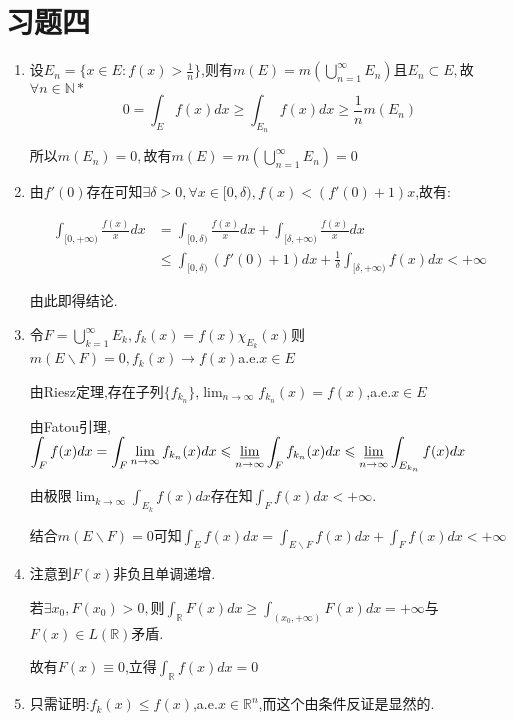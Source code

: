 \documentclass[UTF8, a4paper, 12pt, oneside, onecolumn]{article}
\numberwithin{equation}{section}
\numberwithin{figure}{section}
\numberwithin{table}{section}
\theoremstyle{nonumberplain}	%
\theoremstyle{plain}	%
\theoremstyle{plain}	%
\theoremstyle{plain}	%
\theoremstyle{plain}	%
\theoremstyle{nonumberplain}
\begin{document}
\part{习题四}
\begin{enumerate}
	\item 设$\displaystyle E_n=\{x\in E:f(x)>\frac{1}{n}\} $,则有$\displaystyle m(E)=m(\bigcup_{n=1}^{\infty}E_n)$且$E_n\subset E,$故$\forall n\in\mathbb{N*}$
	$$0=\int_{E}f(x)dx\geqslant \int_{E_n}f(x)dx\geqslant\frac{1}{n}m(E_n)$$
	
	所以$m(E_n)=0,$故有$\displaystyle m(E)=m(\bigcup_{n=1}^{\infty}E_n)=0$
	
	\item 由$f'(0) $存在可知$\exists \delta>0,\forall x\in [0,\delta),f(x)<(f'(0)+1)x$,故有:

	\begin{align*}
		\displaystyle\int_{[0,+\infty)}\frac{f(x)}{x}dx &= \int_{[0,\delta)}\frac{f(x)}{x}dx+\int_{[\delta,+\infty)}\frac{f(x)}{x}dx\\
		&\leqslant\int_{[0,\delta)}(f'(0)+1)dx+\frac{1}{\delta}\int_{[\delta,+\infty)}f(x)dx<+\infty
	\end{align*}
	
	由此即得结论.
	\item 令$\displaystyle F=\bigcup_{k=1}^\infty E_k,f_k(x)=f(x)\chi_{E_k}(x)$则$m(E\backslash F)=0,f_k(x)\rightarrow f(x)$a.e.$x\in E$
	
	由Riesz定理,存在子列$\{f_{k_n}\}$,$\lim_{n\rightarrow \infty}f_{k_n}(x)=f(x)$,a.e.$x\in E$
	
	由Fatou引理,$\displaystyle\int_Ff(x)dx=\int_F\lim_{n\rightarrow \infty}f_{k_n}(x)dx\leqslant\varliminf_{n\rightarrow \infty}\int_Ff_{k_n}(x)dx\leqslant\varliminf_{n\rightarrow \infty}\int_{E_{k_n}}f(x)dx$
	
	由极限$\displaystyle \lim_{k\rightarrow \infty}\int_{E_k}f(x)dx$存在知$\displaystyle\int_F f(x)dx<+\infty$.
	
	结合$m(E\backslash F)=0$可知$\displaystyle\int_Ef(x)dx=\int_{E\backslash F}f(x)dx+\int_{F}f(x)dx<+\infty$
	
	\item 注意到$F(x)$非负且单调递增.
	
	若$\exists x_0,F(x_0)>0,$则$\displaystyle\int_{\mathbb{R}}F(x)dx\geqslant\int_{(x_0,+\infty)}F(x)dx=+\infty$与$F(x)\in L(\mathbb{R})$矛盾.
	
	故有$F(x)\equiv 0$,立得$\displaystyle\int_{\mathbb{R}} f(x)dx=0$
	\item 只需证明:$f_k(x)\leqslant f(x)$,a.e.$x\in \mathbb{R}^n$,而这个由条件反证是显然的.
	

\end{enumerate}
\end{document}
